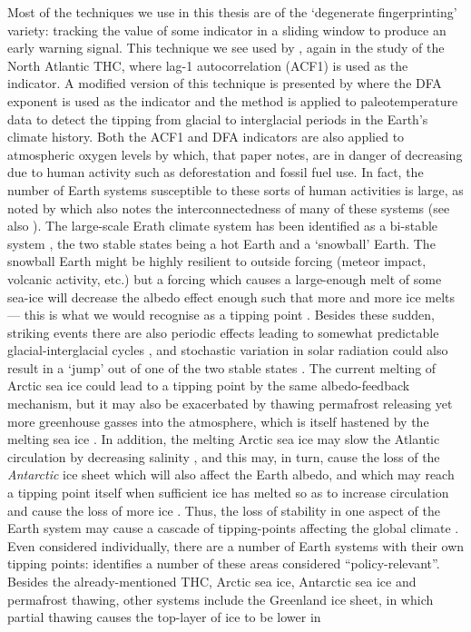 {{%
Most of the techniques we use in this thesis are of the `degenerate fingerprinting' variety: tracking the value of some indicator in a sliding window to produce an early warning signal. This technique we see used by \cite{kleinen2003}, again in the study of the North Atlantic THC, where lag-1 autocorrelation (ACF1) is used as the indicator. A modified version of this technique is presented by \cite{livina2007} where the DFA exponent is used as the indicator and the method is applied to paleotemperature data to detect the tipping from glacial to interglacial periods in the Earth's climate history. Both the ACF1 and DFA indicators are also applied to atmospheric oxygen levels by \cite{livina2015} which, that paper notes, are in danger of decreasing due to human activity such as deforestation and fossil fuel use. In fact, the number of Earth systems susceptible to these sorts of human activities is large, as noted by \cite{lenton2019climate} which also notes the interconnectedness of many of these systems (see also \cite{steffen2018trajectories}). The large-scale Erath climate system has been identified as a bi-stable system \citep{hoffman2002snowball, pierrehumbert2011climate}, the two stable states being a hot Earth and a `snowball' Earth. The snowball Earth might be highly resilient to outside forcing (meteor impact, volcanic activity, etc.) but a forcing which causes a large-enough melt of some sea-ice will decrease the albedo effect enough such that more and more ice melts — this is what we would recognise as a tipping point \citep{hoffman2002snowball,steffen2018trajectories}. Besides these sudden, striking events there are also periodic effects leading to somewhat predictable glacial-interglacial cycles \citep{kwasniok2009,past2016interglacials}, and stochastic variation in solar radiation could also result in a `jump' out of one of the two stable states \citep{lucarini2019transitions}. The current melting of Arctic sea ice \citep{stroeve2007arctic,lindsay2005thinning} could lead to a tipping point by the same albedo-feedback mechanism, but it may also be exacerbated by thawing permafrost releasing yet more greenhouse gasses into the atmosphere, which is itself hastened by the melting sea ice \citep{holland2006future}. In addition, the melting Arctic sea ice may slow the Atlantic circulation by decreasing salinity \citep{stocker1991rapid,rahmstorf2002ocean}, and this may, in turn, cause the loss of the \emph{Antarctic} ice sheet \citep{oppenheimer2004west} which will also affect the Earth albedo, and which may reach a tipping point itself when sufficient ice has melted so as to increase circulation and cause the loss of more ice \citep{mercer1978west,oppenheimer1998global}. Thus, the loss of stability in one aspect of the Earth system may cause a cascade of tipping-points affecting the global climate \citep{steffen2018trajectories,lenton2019climate}. Even considered individually, there are a number of Earth systems with their own tipping points: \cite{lenton2008} identifies a number of these areas considered ``policy-relevant''. Besides the already-mentioned THC, Arctic sea ice, Antarctic sea ice and permafrost thawing, other systems include the Greenland ice sheet, in which partial thawing causes the top-layer of ice to be lower in }}
